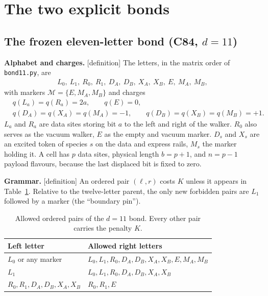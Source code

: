 \documentclass[11pt]{article}
\newcommand{\tg}[1]{\textsf{[#1]}}
\newcommand{\repo}[1]{\texttt{#1}}
\begin{document}
\section{The two explicit bonds}\label{sec:bonds}

\subsection{The frozen eleven-letter bond (C84, $d=11$)}

\textbf{Alphabet and charges.} \tg{definition} The letters, in the matrix order of \repo{bond11.py}, are
\begin{align}
L_0,\ L_1,\ R_0,\ R_1,\ D_A,\ D_B,\ X_A,\ X_B,\ E,\ M_A,\ M_B ,\label{eq:alph}
\end{align}
with markers $\mathcal{M}=\{E,M_A,M_B\}$ and charges
\begin{align}
&q(L_a)=q(R_a)=2a,\qquad q(E)=0,\nonumber\\
&q(D_A)=q(X_A)=q(M_A)=-1,\qquad q(D_B)=q(X_B)=q(M_B)=+1.\label{eq:charge}
\end{align}
$L_a$ and $R_a$ are data sites storing bit $a$ to the left and right of the walker. $R_0$ also serves as the vacuum walker, $E$ as the empty and vacuum marker. $D_s$ and $X_s$ are an excited token of species $s$ on the data and express rails, $M_s$ the marker holding it. A cell has $p$ data sites, physical length $b=p+1$, and $n=p-1$ payload flavours, because the last displaced bit is fixed to zero.

\textbf{Grammar.} \tg{definition} An ordered pair $(\ell,r)$ costs $K$ unless it appears in Table~\ref{tab:pairs}. Relative to the twelve-letter parent, the only new forbidden pairs are $L_1$ followed by a marker (the ``boundary pin'').

\begin{table}[h]
\centering
\begin{tabular}{ll}
\toprule
Left letter & Allowed right letters\\
\midrule
$L_0$ or any marker & $L_0,L_1,R_0,D_A,D_B,X_A,X_B,E,M_A,M_B$\\
$L_1$ & $L_0,L_1,R_0,D_A,D_B,X_A,X_B$\\
$R_0,R_1,D_A,D_B,X_A,X_B$ & $R_0,R_1,E$\\
\bottomrule
\end{tabular}
\caption{Allowed ordered pairs of the $d=11$ bond. Every other pair carries the penalty $K$.}\label{tab:pairs}
\end{table}
\end{document}
